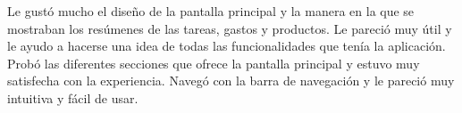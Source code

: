 Le gustó mucho el diseño de la pantalla principal y la manera en la que se mostraban los resúmenes de las tareas, gastos y productos.
Le pareció muy útil y le ayudo a hacerse una idea de todas las funcionalidades que tenía la aplicación. Probó las diferentes secciones que 
ofrece la pantalla principal y estuvo muy satisfecha con la experiencia. Navegó con la barra de navegación y le pareció muy intuitiva y fácil de usar.










































